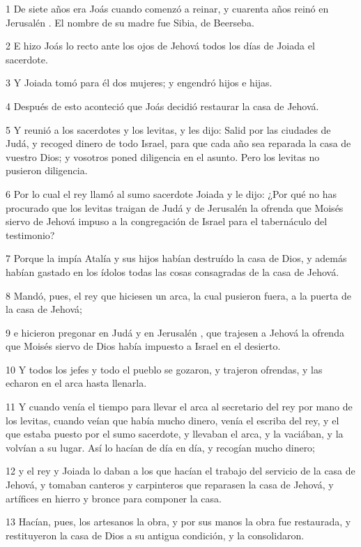 \par 1 De siete años era Joás cuando comenzó a reinar, y cuarenta años reinó en Jerusalén . El nombre de su madre fue Sibia, de Beerseba.
\par 2 E hizo Joás lo recto ante los ojos de Jehová todos los días de Joiada el sacerdote.
\par 3 Y Joiada tomó para él dos mujeres; y engendró hijos e hijas.
\par 4 Después de esto aconteció que Joás decidió restaurar la casa de Jehová.
\par 5 Y reunió a los sacerdotes y los levitas, y les dijo: Salid por las ciudades de Judá, y recoged dinero de todo Israel, para que cada año sea reparada la casa de vuestro Dios; y vosotros poned diligencia en el asunto. Pero los levitas no pusieron diligencia.
\par 6 Por lo cual el rey llamó al sumo sacerdote Joiada y le dijo: ¿Por qué no has procurado que los levitas traigan de Judá y de Jerusalén la ofrenda que Moisés siervo de Jehová  impuso a la congregación de Israel para el tabernáculo del testimonio? 
\par 7 Porque la impía Atalía y sus hijos habían destruído la casa de Dios, y además habían gastado en los ídolos todas las cosas consagradas de la casa de Jehová.
\par 8 Mandó, pues, el rey que hiciesen un arca, la cual pusieron fuera, a la puerta de la casa de Jehová;
\par 9 e hicieron pregonar en Judá y en Jerusalén , que trajesen a Jehová la ofrenda que Moisés siervo de Dios había impuesto a Israel en el desierto.
\par 10 Y todos los jefes y todo el pueblo se gozaron, y trajeron ofrendas, y las echaron en el arca hasta llenarla.
\par 11 Y cuando venía el tiempo para llevar el arca al secretario del rey por mano de los levitas, cuando veían que había mucho dinero, venía el escriba del rey, y el que estaba puesto por el sumo sacerdote, y llevaban el arca, y la vaciában, y la volvían a su lugar. Así lo hacían de día en día, y recogían mucho dinero;
\par 12 y el rey y Joiada lo daban a los que hacían el trabajo del servicio de la casa de Jehová, y tomaban canteros y carpinteros que reparasen la casa de Jehová, y artífices en hierro y bronce para componer la casa.
\par 13 Hacían, pues, los artesanos la obra, y por sus manos la obra fue restaurada, y restituyeron la casa de Dios a su antigua condición, y la consolidaron.
